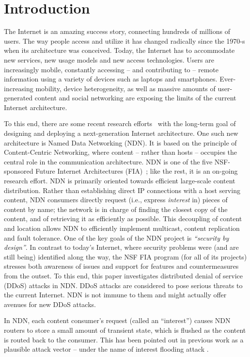 \documentclass[10pt,conference,letterpaper]{IEEEtran}
\begin{document}
\section{Introduction}
\label{introduction}

The Internet is an amazing success story, connecting hundreds of millions of users.
The way people access and utilize it has changed radically since the 1970-s when its 
architecture was conceived. Today, the Internet has to accommodate new services, 
new usage models and new access technologies. Users are increasingly mobile,
constantly accessing -- and contributing to -- remote information using a variety
of devices such as laptops and smartphones. Ever-increasing mobility, device 
heterogeneity, as well as massive amounts of user-generated content and social networking 
are exposing the limits of the current Internet architecture. 

To this end, there are some recent research 
efforts~\cite{NDN,XIA,mobility-first,nebula,choicenet} with the long-term goal of 
designing and deploying a next-generation Internet architecture. 
One such new architecture is Named Data Networking (NDN). It is based on the principle 
of  Content-Centric Networking, where content -- rather than hosts -- occupies the central 
role 
in the communication architecture. NDN is one of the five NSF-sponsored Future Internet 
Architectures (FIA)~\cite{FIA}; like the rest, it is an on-going research effort.
NDN is primarily oriented towards efficient large-scale content distribution. Rather than 
establishing 
direct IP connections with a host serving content, NDN consumers directly request (i.e., 
express 
{\em interest} in) pieces of content by name; the network is in charge of finding the closest copy of the content, and of retrieving it 
as efficiently as possible. This decoupling of content and location allows NDN to 
efficiently implement multicast, content replication and fault tolerance.
One of the key goals of the NDN project is {\em ``security by design''}. In contrast 
to today's Internet, where security problems were (and are still being) identified along 
the way, the NSF FIA program (for all of its projects) stresses both awareness of 
issues and support for features and countermeasures from the outset. 
To this end, this paper investigates distributed denial of service (DDoS) attacks in NDN.
DDoS attacks are considered to pose serious threats to the current Internet. 
NDN is not immune to them and might actually offer avenues for new DDoS
attacks. 

In NDN, each content consumer's request (called an ``interest'') causes NDN 
routers to store a small amount of transient state, which is flushed as 
the content is routed back to the consumer. This has been pointed out 
in previous work as a plausible attack vector -- under the name of interest flooding 
attack \cite{ndn-dos,WahlishSV12}.
\end{document}
